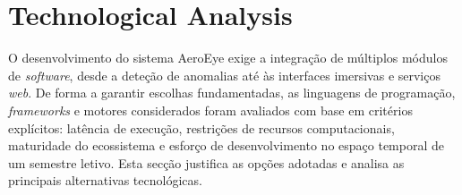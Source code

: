 \documentclass[conference,a4paper]{IEEEtran}
\begin{document}

\section{Technological Analysis}
O desenvolvimento do sistema AeroEye exige a integração de múltiplos módulos de \textit{software}, desde a deteção de anomalias até às interfaces imersivas e serviços \textit{web}. De forma a garantir escolhas fundamentadas, as linguagens de programação, \textit{frameworks} e motores considerados foram avaliados com base em critérios explícitos: latência de execução, restrições de recursos computacionais, maturidade do ecossistema e esforço de desenvolvimento no espaço temporal de um semestre letivo. Esta secção justifica as opções adotadas e analisa as principais alternativas tecnológicas.
\end{document}
